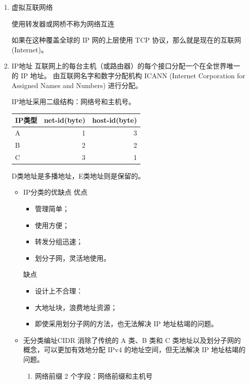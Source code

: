\documentclass[11pt]{article}
\begin{document}
\begin{enumerate}
\item 虚拟互联网络
\label{sec:orgf4af3a2}

使用转发器或网桥不称为网络互连

如果在这种覆盖全球的 IP 网的上层使用 TCP 协议，那么就是现在的互联网 (Internet)。

\item IP地址
\label{sec:org4f705bf}
互联网上的每台主机（或路由器）的每个接口分配一个在全世界唯一的 IP 地址。
由互联网名字和数字分配机构 ICANN (Internet Corporation for Assigned Names and Numbers) 进行分配。 

IP地址采用二级结构：网络号和主机号。

\begin{center}
\begin{tabular}{lrr}
IP类型 & net-id(byte) & host-id(byte)\\[0pt]
\hline
A & 1 & 3\\[0pt]
B & 2 & 2\\[0pt]
C & 3 & 1\\[0pt]
\end{tabular}
\end{center}

D类地址是多播地址，E类地址则是保留的。

\begin{itemize}
\item IP分类的优缺点
优点
\begin{itemize}
\item 管理简单；
\item 使用方便；
\item 转发分组迅速；
\item 划分子网，灵活地使用。
\end{itemize}
缺点
\begin{itemize}
\item 设计上不合理：
\item 大地址块，浪费地址资源；
\item 即使采用划分子网的方法，也无法解决 IP 地址枯竭的问题。
\end{itemize}

\item 无分类编址CIDR
消除了传统的 A 类、B 类和 C 类地址以及划分子网的概念，可以更加有效地分配 IPv4 的地址空间，但无法解决 IP 地址枯竭的问题。

\begin{enumerate}
\item 网络前缀
2 个字段：网络前缀和主机号


\end{enumerate}
\end{itemize}
\end{enumerate}
\end{document}
